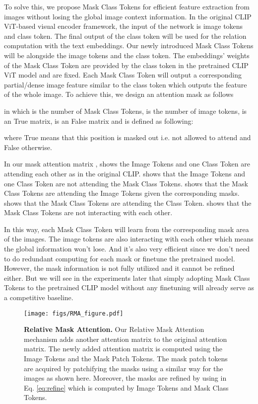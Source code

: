 \documentclass{article}
\theoremstyle{plain}
\theoremstyle{definition}
\theoremstyle{remark}
\begin{document}
To solve this, we propose Mask Class Tokens for efficient feature extraction from images without losing the global image context information. In the original CLIP ViT-based visual encoder framework, the input of the network is  image tokens and  class token. The final output of the class token will be used for the relation computation with the text embeddings. Our newly introduced  Mask Class Tokens will be alongside the image tokens and the class token. The embeddings' weights of the Mask Class Token are provided by the class token in the pretrained CLIP ViT model and are fixed. Each Mask Class Token will output a corresponding partial/dense image feature similar to the class token which outputs the feature of the whole image. To achieve this, we design an attention mask as follows

in which  is the number of Mask Class Tokens,  is the number of image tokens,  is an  True matrix,  is an  False matrix and  is defined as following:

where True means that this position is masked out i.e. not allowed to attend and False otherwise. 

 In our mask attention matrix ,  shows the  Image Tokens and one Class Token are attending each other as in the original CLIP.  shows that the  Image Tokens and one Class Token are not attending the  Mask Class Tokens.  shows that the Mask Class Tokens are attending the Image Tokens given the corresponding masks.  shows that the  Mask Class Tokens are attending the Class Token.  shows that the  Mask Class Tokens are not interacting with each other.

In this way, each Mask Class Token will learn from the corresponding mask area of the images. The image tokens are also interacting with each other which means the global information won't lose. And it's also very efficient since we don't need to do redundant computing for each mask or finetune the pretrained model. However, the mask information is not fully utilized and it cannot be refined either. But we will see in the experiments later that simply adopting Mask Class Tokens to the pretrained CLIP model without any finetuning will already serve as a competitive baseline.


\label{sec:rma}

\begin{figure}[!htp]
\begin{center}
\texttt{[image: figs/RMA\_figure.pdf]}
  \caption{\small \textbf{Relative Mask Attention.} Our Relative Mask Attention mechanism adds another attention matrix  to the original attention matrix. The newly added attention matrix is computed using the Image Tokens and the Mask Patch Tokens. The mask patch tokens are acquired by patchifying the masks using a similar way for the images as shown here. Moreover, the masks are refined by using  in Eq. \ref{eq:refine} which is computed by Image Tokens and Mask Class Tokens.} 
\label{fig:rma}
\end{center}
 \end{figure}
\end{document}
